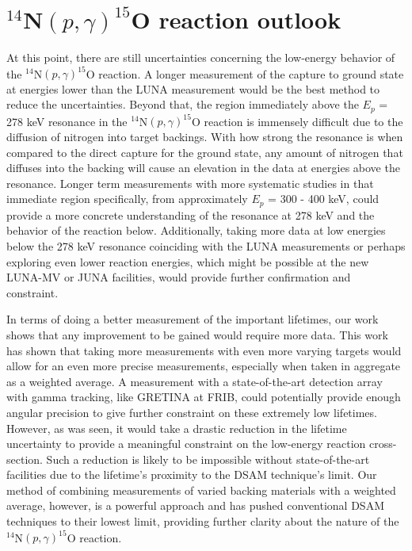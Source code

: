 \section{$^{14}$N$\left( p,\gamma \right) ^{15}$O reaction outlook}
\label{sec: outlook}

At this point, there are still uncertainties concerning the low-energy behavior of the $^{14}$N$\left( p,\gamma \right) ^{15}$O reaction. A longer measurement of the capture to ground state at energies lower than the LUNA measurement would be the best method to reduce the uncertainties. Beyond that, the region immediately above the $E_{p}$ = 278 keV resonance in the $^{14}$N$\left( p,\gamma \right) ^{15}$O reaction is immensely difficult due to the diffusion of nitrogen into target backings. With how strong the resonance is when compared to the direct capture for the ground state, any amount of nitrogen that diffuses into the backing will cause an elevation in the data at energies above the resonance. Longer term measurements with more systematic studies in that immediate region specifically, from approximately $E_{p}$ = 300 - 400 keV, could provide a more concrete understanding of the resonance at 278 keV and the behavior of the reaction below. Additionally, taking more data at low energies below the 278 keV resonance coinciding with the LUNA measurements or perhaps exploring even lower reaction energies, which might be possible at the new LUNA-MV or JUNA facilities, would provide further confirmation and constraint. 

In terms of doing a better measurement of the important lifetimes, our work shows that any improvement to be gained would require more data. This work has shown that taking more measurements with even more varying targets would allow for an even more precise measurements, especially when taken in aggregate as a weighted average. A measurement with a state-of-the-art detection array with gamma tracking, like GRETINA at FRIB, could potentially provide enough angular precision to give further constraint on these extremely low lifetimes. However, as was seen, it would take a drastic reduction in the lifetime uncertainty to provide a meaningful constraint on the low-energy reaction cross-section. Such a reduction is likely to be impossible without state-of-the-art facilities due to the lifetime's proximity to the DSAM technique's limit. Our method of combining measurements of varied backing materials with a weighted average, however, is a powerful approach and has pushed conventional DSAM techniques to their lowest limit, providing further clarity about the nature of the $^{14}$N$\left( p,\gamma \right) ^{15}$O reaction. 



%
% 
% 
